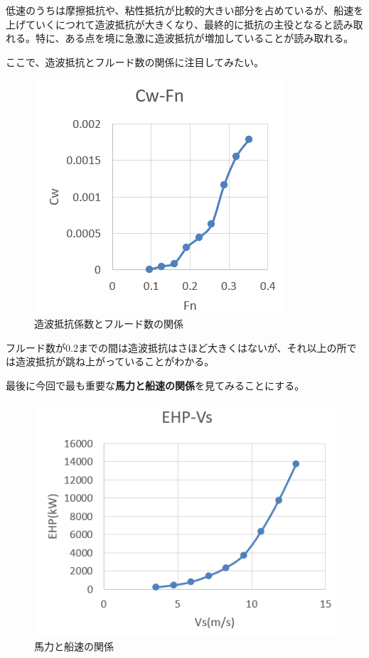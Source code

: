 \documentclass[dvipdfmx,a4paper]{jreport} %
\begin{document}
低速のうちは摩擦抵抗や、粘性抵抗が比較的大きい部分を占めているが、船速を上げていくにつれて造波抵抗が大きくなり、最終的に抵抗の主役となると読み取れる。特に、ある点を境に急激に造波抵抗が増加していることが読み取れる。

\vspace{5mm}

ここで、造波抵抗とフルード数の関係に注目してみたい。

\begin{figure}[H]
    \centering
    \includegraphics[width=0.5\linewidth]{summer/ship-experiment/circulating-water-channel/cw-fn.png}
    \caption{造波抵抗係数とフルード数の関係}
    \label{fig:cw-fn}
\end{figure}

フルード数が0.2までの間は造波抵抗はさほど大きくはないが、それ以上の所では造波抵抗が跳ね上がっていることがわかる。

\vspace{5mm}

最後に今回で最も重要な\textbf{馬力と船速の関係}を見てみることにする。

\begin{figure}[H]
    \centering
    \includegraphics[width=0.5\linewidth]{summer/ship-experiment/circulating-water-channel/ehp-vs.png}
    \caption{馬力と船速の関係}
    \label{fig:ehp-vs}
\end{figure}
\end{document}

